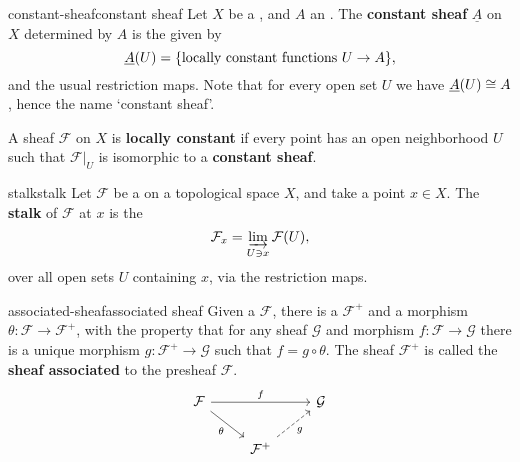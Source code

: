 \begin{topic}{constant-sheaf}{constant sheaf}
    Let $X$ be a , and $A$ an . The \textbf{constant sheaf} $\underline{A}$ on $X$ determined by $A$ is the  given by
    \[ \underline{A}(U) = \{ \textup{locally constant functions } U \to A \} , \]
    and the usual restriction maps. Note that for every  open set $U$ we have $\underline{A}(U) \cong A$, hence the name `constant sheaf'.
    
    A sheaf $\mathcal{F}$ on $X$ is \textbf{locally constant} if every point has an open neighborhood $U$ such that $\mathcal{F}|_U$ is isomorphic to a \textbf{constant sheaf}.
\end{topic}

\begin{topic}{stalk}{stalk}
    Let $\mathcal{F}$ be a  on a topological space $X$, and take a point $x \in X$. The \textbf{stalk} of $\mathcal{F}$ at $x$ is the 
    \[ \mathcal{F}_x = \varinjlim_{U \ni x} \mathcal{F}(U) , \]
    over all open sets $U$ containing $x$, via the restriction maps.
\end{topic}

\begin{topic}{associated-sheaf}{associated sheaf}
    Given a  $\mathcal{F}$, there is a  $\mathcal{F}^+$ and a morphism $\theta \colon \mathcal{F} \to \mathcal{F}^+$, with the property that for any sheaf $\mathcal{G}$ and morphism $f \colon \mathcal{F} \to \mathcal{G}$ there is a unique morphism $g \colon \mathcal{F}^+ \to \mathcal{G}$ such that $f = g \circ \theta$. The sheaf $\mathcal{F}^+$ is called the \textbf{sheaf associated} to the presheaf $\mathcal{F}$.
    \[ \svg \begin{tikzcd} \mathcal{F} \arrow{rr}{f} \arrow[swap]{dr}{\theta} && \mathcal{G} \\ & \mathcal{F}^+ \arrow[swap,dashed]{ur}{g} & \end{tikzcd} \]
\end{topic}

